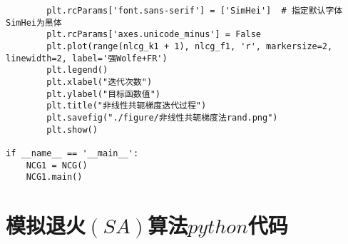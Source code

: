 \begin{lstlisting}
        plt.rcParams['font.sans-serif'] = ['SimHei']  # 指定默认字体 SimHei为黑体
        plt.rcParams['axes.unicode_minus'] = False
        plt.plot(range(nlcg_k1 + 1), nlcg_f1, 'r', markersize=2, linewidth=2, label='强Wolfe+FR')
        plt.legend()
        plt.xlabel("迭代次数")
        plt.ylabel("目标函数值")
        plt.title("非线性共轭梯度迭代过程")
        plt.savefig("./figure/非线性共轭梯度法rand.png")
        plt.show()

if __name__ == '__main__':
    NCG1 = NCG()
    NCG1.main()
\end{lstlisting}

\section{模拟退火$(SA)$算法$python$代码}
